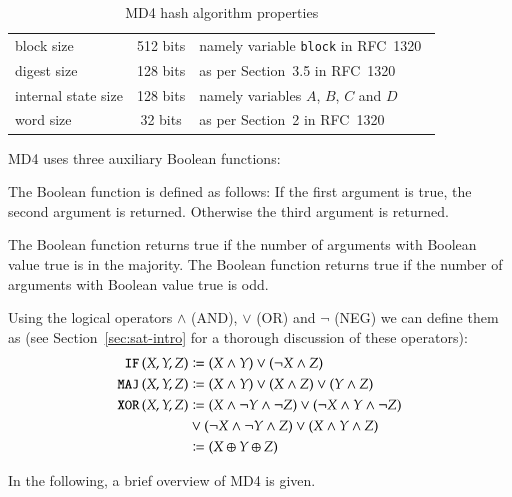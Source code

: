 \begin{table}[h]
  \begin{center}
    \begin{tabular}{lcl}
      block size           & 512 bits       & namely variable \texttt{block} in RFC~1320~\cite{rfc1320} \\
      digest size          & 128 bits       & as per Section~3.5 in RFC~1320~\cite{rfc1320} \\
      internal state size  & 128 bits       & namely variables $A$, $B$, $C$ and $D$ \\
      word size            & 32 bits        & as per Section~2 in RFC~1320~\cite{rfc1320} \\
    \end{tabular}
    \caption{MD4 hash algorithm properties}
    \label{tab:md4}
  \end{center}
\end{table}

MD4 uses three auxiliary Boolean functions:
\begin{defi}
  The Boolean  function is defined as follows:
  If the first argument is true, the second argument is returned.
  Otherwise the third argument is returned.

  The Boolean  function returns true if the number
  of arguments with Boolean value true is in the majority.
  The Boolean  function returns true if the number
  of arguments with Boolean value true is odd.
\end{defi}

Using the logical operators $\land$ (AND), $\lor$ (OR) and $\neg$ (NEG)
we can define them as (see Section~\ref{sec:sat-intro} for a thorough
discussion of these operators):
\begin{align}
  \operatorname{\texttt{IF\,}}(X,Y,Z) &\coloneqq (X \land Y) \lor (\neg X \land Z) \\
  \operatorname{\texttt{MAJ\,}}(X,Y,Z) &\coloneqq (X \land Y) \lor (X \land Z) \lor (Y \land Z) \\
  \operatorname{\texttt{XOR\,}}(X,Y,Z) &\coloneqq (X \land \neg Y \land \neg Z) \lor (\neg X \land Y \land \neg Z) \nonumber\\
              &\lor (\neg X \land \neg Y \land Z) \lor (X \land Y \land Z) \nonumber\\
              &\coloneqq (X \oplus Y \oplus Z)
\end{align}

In the following, a brief overview of MD4 is given.


